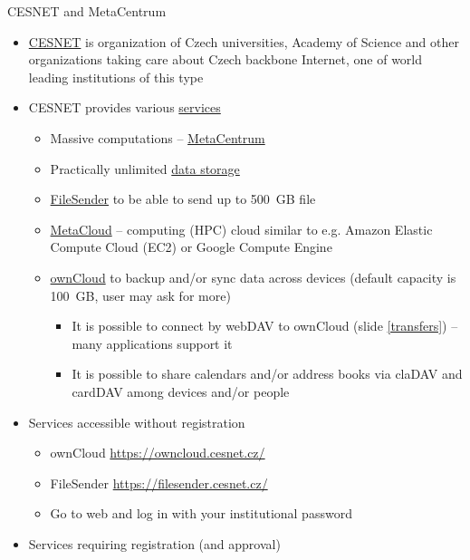 \documentclass[compress, ucs, xelatex, 11pt, xcolor=svgnames,
  hyperref={
    bookmarks=true,
    unicode=true,
    colorlinks=true,
    pdftitle={Linux, command line and MetaCentrum},
    plainpages=false,
    pdfauthor={Vojtech Zeisek},
    pdfsubject={Course about use of Linux command line, writing shell scripts and using MetaCentrum of CESNET},
    pdfcreator={XeLaTeX},
    pdfkeywords={Linux, GNU, BASH, shell, command line, MetaCentrum},
    linkcolor=DarkRed,
    anchorcolor=DarkBlue,
    citecolor=Indigo,
    filecolor=NavyBlue,
    menucolor=DarkMagenta,
    urlcolor=DarkBlue,
    pdftex},
  url={hyphens, lowtilde} %
  ]{beamer}
\begin{document}
\begin{frame}[allowframebreaks]{CESNET and MetaCentrum}
  \begin{itemize}
    \item \href{https://www.cesnet.cz/?lang=en}{CESNET} is organization of Czech universities, Academy of Science and other organizations taking care about Czech backbone Internet, one of world leading institutions of this type
    \item CESNET provides various \href{https://www.cesnet.cz/services/?lang=en}{services}
    \begin{itemize}
      \item Massive computations -- \href{https://www.cesnet.cz/services/massive-computations-metacentrum/?lang=en}{MetaCentrum}
      \item Practically unlimited \href{https://www.cesnet.cz/services/data-storage/?lang=en}{data storage}
      \item \href{https://www.cesnet.cz/services/filesender/?lang=en}{FileSender} to be able to send up to 500~GB file
      \item \href{https://www.metacentrum.cz/en/Sluzby/MetaCloud/}{MetaCloud} -- computing (HPC) cloud similar to e.g. Amazon Elastic Compute Cloud (EC2) or Google Compute Engine
      \item \href{https://www.cesnet.cz/services/owncloud/?lang=en}{ownCloud} to backup and/or sync data across devices (default capacity is 100~GB, user may ask for more)
      \begin{itemize}
	\item It is possible to connect by webDAV to ownCloud (slide \ref{transfers}) -- many applications support it
	\item It is possible to share calendars and/or address books via claDAV and cardDAV among devices and/or people
      \end{itemize}
    \end{itemize}
    \item Services accessible without registration
    \begin{itemize}
      \item ownCloud \url{https://owncloud.cesnet.cz/}
      \item FileSender \url{https://filesender.cesnet.cz/}
      \item Go to web and log in with your institutional password
    \end{itemize}
    \item Services requiring registration (and approval)

\end{itemize}
\end{frame}
\end{document}
